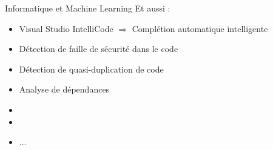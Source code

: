 \begin{frame}{Informatique et Machine Learning}
  Et aussi :
  \begin{itemize}
  \item Visual Studio IntelliCode $\Rightarrow$ Complétion automatique intelligente
  \item Détection de faille de sécurité dans le code
  \item Détection de quasi-duplication de code
  \item Analyse de dépendances
  \item {}
  \item {}
  \item ...
  \end{itemize}
\end{frame}
